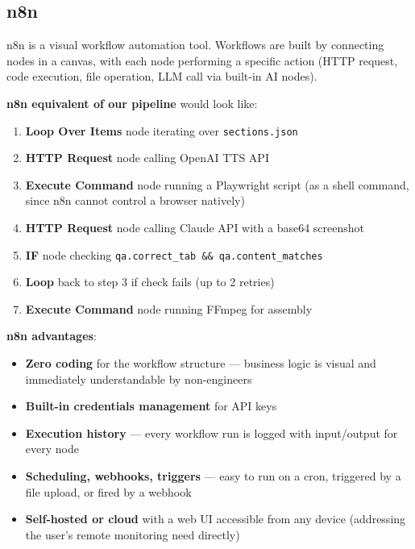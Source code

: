 \documentclass[12pt,a4paper]{article}
\begin{document}
\subsection{n8n}

n8n is a visual workflow automation tool. Workflows are built by connecting
nodes in a canvas, with each node performing a specific action (HTTP request,
code execution, file operation, LLM call via built-in AI nodes).

\textbf{n8n equivalent of our pipeline} would look like:

\begin{enumerate}[leftmargin=2em]
  \item \textbf{Loop Over Items} node iterating over \texttt{sections.json}
  \item \textbf{HTTP Request} node calling OpenAI TTS API
  \item \textbf{Execute Command} node running a Playwright script (as a shell
        command, since n8n cannot control a browser natively)
  \item \textbf{HTTP Request} node calling Claude API with a base64 screenshot
  \item \textbf{IF} node checking \texttt{qa.correct\_tab \&\& qa.content\_matches}
  \item \textbf{Loop} back to step 3 if check fails (up to 2 retries)
  \item \textbf{Execute Command} node running FFmpeg for assembly
\end{enumerate}

\textbf{n8n advantages}:
\begin{itemize}[leftmargin=2em]
  \item \textbf{Zero coding} for the workflow structure --- business logic is
        visual and immediately understandable by non-engineers
  \item \textbf{Built-in credentials management} for API keys
  \item \textbf{Execution history} --- every workflow run is logged with
        input/output for every node
  \item \textbf{Scheduling, webhooks, triggers} --- easy to run on a cron,
        triggered by a file upload, or fired by a webhook
  \item \textbf{Self-hosted or cloud} with a web UI accessible from any device
        (addressing the user's remote monitoring need directly)
\end{itemize}
\end{document}
